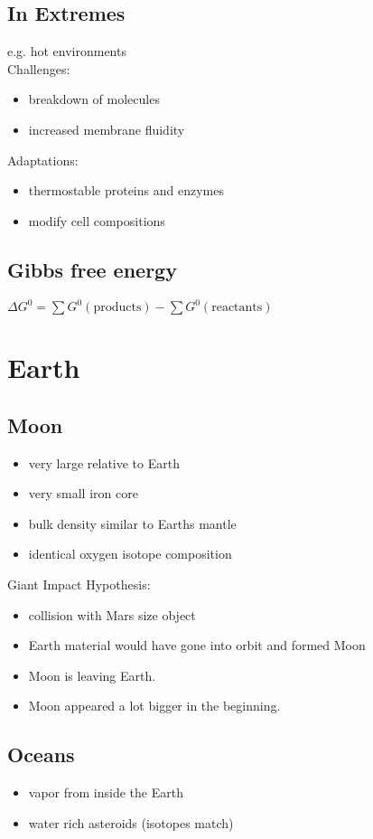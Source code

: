 \documentclass{article}
\theoremstyle{sltheorem}
\begin{document}
\subsection{In Extremes}
e.g. hot environments\\
Challenges:
\begin{itemize}
	\item breakdown of molecules
	\item increased membrane fluidity
\end{itemize}
Adaptations:
\begin{itemize}
	\item thermostable proteins and enzymes
	\item modify cell compositions
\end{itemize}
\subsection{Gibbs free energy}
$\Delta G^0 =\sum G^0(\text{products}) - \sum G^0(\text{reactants})$
\section{Earth}
\subsection{Moon}
\begin{itemize}
	\item very large relative to Earth
	\item very small iron core
	\item bulk density similar to Earths mantle
	\item identical oxygen isotope composition
\end{itemize}
Giant Impact Hypothesis:
\begin{itemize}
	\item collision with Mars size object
	\item Earth material would have gone into orbit and formed Moon
	\item Moon is leaving Earth.
	\item Moon appeared a lot bigger in the beginning.
\end{itemize}
\subsection{Oceans}
\begin{itemize}
	\item vapor from inside the Earth
	\item water rich asteroids (isotopes match)
\end{itemize}
\end{document}
